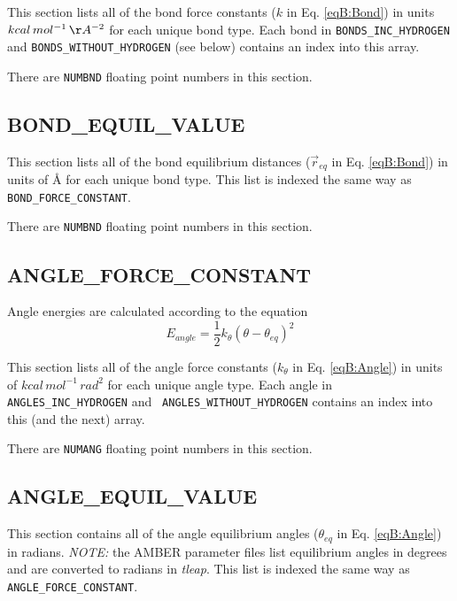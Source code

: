This section lists all of the bond force constants ($k$ in Eq. \ref{eqB:Bond})
in units $kcal\, mol^{-1}\, \AA^{-2}$ for each unique bond type. Each bond in
{\tt BONDS\_INC\_HYDROGEN} and {\tt BONDS\_WITHOUT\_HYDROGEN} (see below)
contains an index into this array.


\noindent There are {\tt NUMBND} floating point numbers in this section.

\subsection*{BOND\_EQUIL\_VALUE}

This section lists all of the bond equilibrium distances ($\vec{r}_{eq}$ in Eq.
\ref{eqB:Bond}) in units of {\AA} for each unique bond type. This list is
indexed the same way as {\tt BOND\_FORCE\_CONSTANT}.


\noindent There are {\tt NUMBND} floating point numbers in this section.

\subsection*{ANGLE\_FORCE\_CONSTANT}

Angle energies are calculated according to the equation
\begin{equation}
   E_{angle} = \frac 1 2 k_{\theta} \left ( \theta - \theta _ {eq} \right ) ^ 2
   \label{eqB:Angle}
\end{equation}

This section lists all of the angle force constants ($k_{\theta}$ in Eq.
\ref{eqB:Angle}) in units of $kcal\, mol^{-1}\, rad^2$ for each unique angle
type. Each angle in {\tt ANGLES\_INC\_HYDROGEN} and {\tt
ANGLES\_WITHOUT\_HYDROGEN} contains an index into this (and the next) array.


\noindent There are {\tt NUMANG} floating point numbers in this section.

\subsection*{ANGLE\_EQUIL\_VALUE}

This section contains all of the angle equilibrium angles ($\theta_{eq}$ in Eq.
\ref{eqB:Angle}) in radians.  \emph{NOTE:} the AMBER parameter files list
equilibrium angles in degrees and are converted to radians in \emph{tleap}. This
list is indexed the same way as {\tt ANGLE\_FORCE\_CONSTANT}.

